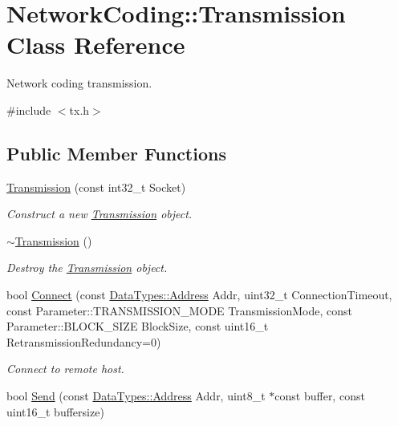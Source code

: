 \hypertarget{class_network_coding_1_1_transmission}{}\section{Network\+Coding\+:\+:Transmission Class Reference}
\label{class_network_coding_1_1_transmission}


Network coding transmission.  




{\ttfamily \#include $<$tx.\+h$>$}

\subsection*{Public Member Functions}
\begin{DoxyCompactItemize}
\item 
\hyperlink{class_network_coding_1_1_transmission_a0088c71d39d15bcbdeab5be97ca9c521}{Transmission} (const int32\+\_\+t Socket)
\begin{DoxyCompactList}\small\item\em Construct a new \hyperlink{class_network_coding_1_1_transmission}{Transmission} object. \end{DoxyCompactList}\item 
\hyperlink{class_network_coding_1_1_transmission_adcdc6012d99ddb1d0c3159d50984e146}{$\sim$\+Transmission} ()
\begin{DoxyCompactList}\small\item\em Destroy the \hyperlink{class_network_coding_1_1_transmission}{Transmission} object. \end{DoxyCompactList}\item 
bool \hyperlink{class_network_coding_1_1_transmission_acf7b8882079065561cf712db570f1a97}{Connect} (const \hyperlink{class_network_coding_1_1_data_types_1_1_address}{Data\+Types\+::\+Address} Addr, uint32\+\_\+t Connection\+Timeout, const Parameter\+::\+T\+R\+A\+N\+S\+M\+I\+S\+S\+I\+O\+N\+\_\+\+M\+O\+DE Transmission\+Mode, const Parameter\+::\+B\+L\+O\+C\+K\+\_\+\+S\+I\+ZE Block\+Size, const uint16\+\_\+t Retransmission\+Redundancy=0)
\begin{DoxyCompactList}\small\item\em Connect to remote host. \end{DoxyCompactList}\item 
bool \hyperlink{class_network_coding_1_1_transmission_a374d54400d1a31f7d85119670d896aa8}{Send} (const \hyperlink{class_network_coding_1_1_data_types_1_1_address}{Data\+Types\+::\+Address} Addr, uint8\+\_\+t $\ast$const buffer, const uint16\+\_\+t buffersize)

\end{DoxyCompactItemize}
